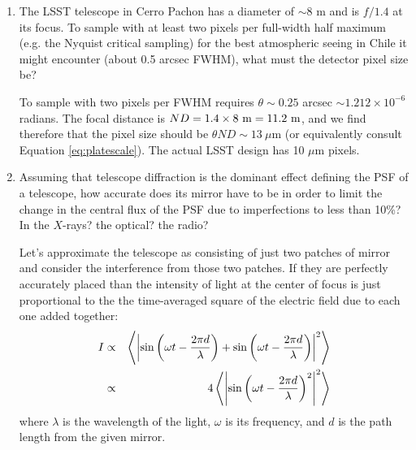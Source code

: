 \begin{enumerate}
\item The LSST telescope in Cerro Pachon has a diameter of $\sim 8$ m
    and is $f/1.4$ at its focus. To sample with at least two pixels
    per full-width half maximum (e.g. the Nyquist critical sampling)
    for the best atmospheric seeing in Chile it might encounter (about
    0.5 arcsec FWHM), what must the detector pixel size be?

\begin{answer}
To sample with two pixels per FWHM requires $\theta\sim 0.25$ arcsec
$\sim 1.212 \times 10^{-6}$ radians.  The focal distance is $N D =
1.4\times 8 {\rm ~m} = 11.2 {\rm ~m}$, and we find therefore that the
pixel size should be $\theta N D \sim 13~\mu$m (or equivalently
consult Equation \ref{eq:platescale}). The actual LSST design has 10
$\mu$m pixels.
\end{answer}

\item Assuming that telescope diffraction is the dominant effect
defining the PSF of a telescope, how accurate does its mirror have to
    be in order to limit the change in the central flux of the PSF due
    to imperfections to less than 10\%? In the $X$-rays? the optical?
    the radio?

\begin{answer}
Let's approximate the telescope as consisting of just two patches of
mirror and consider the interference from those two patches. If they
are perfectly accurately placed than the intensity of light at the
center of focus is just proportional to the the time-averaged square
of the electric field due to each one added together:
\begin{eqnarray}
I &\propto& \left\langle
\left|
\sin\left(\omega t - \frac{2\pi d}{\lambda}\right) +
\sin\left(\omega t - \frac{2\pi d}{\lambda}\right)
\right|^2 \right\rangle \cr
&\propto& 4 \left\langle
\left|
\sin\left(\omega t - \frac{2\pi d}{\lambda}\right)^2
\right|^2 \right\rangle
\end{eqnarray}
where $\lambda$ is the wavelength of the light, $\omega$ is its
frequency, and $d$ is the path length from the given mirror.


\end{answer}
\end{enumerate}
